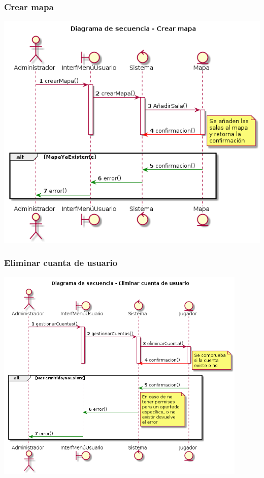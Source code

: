 \subsubsection{Crear mapa}
  \includegraphics[width=1\textwidth]{./imatges/administrador/Crear_mapa.png}
\subsubsection{Eliminar cuanta de usuario}
  \includegraphics[width=0.9\textwidth]{./imatges/administrador/Eliminar_cuenta_de_usuario.png}
